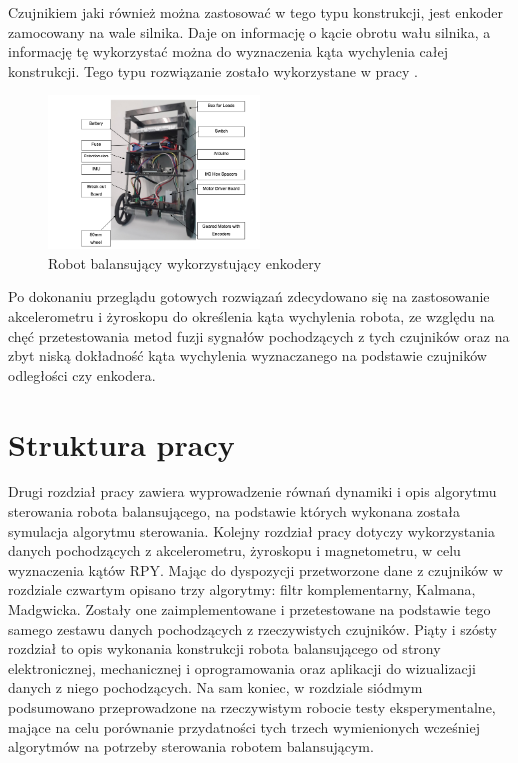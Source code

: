 Czujnikiem jaki również można zastosować w tego typu konstrukcji, jest enkoder zamocowany na wale silnika. Daje on informację o kącie obrotu wału silnika, a informację tę wykorzystać można do wyznaczenia kąta wychylenia całej konstrukcji. Tego typu rozwiązanie zostało wykorzystane w pracy \cite{Konstrukcja3}.

\begin{figure}[h!]
    \centering
	\includegraphics[width=0.5\textwidth]{Rysunki/Rozdzial01/Konstrukcja3.png}
	\caption{Robot balansujący wykorzystujący enkodery}
\end{figure}

Po dokonaniu przeglądu gotowych rozwiązań zdecydowano się na zastosowanie akcelerometru i żyroskopu do określenia kąta wychylenia robota, ze względu na chęć przetestowania metod fuzji sygnałów pochodzących z tych czujników oraz na zbyt niską dokładność kąta wychylenia wyznaczanego na podstawie czujników odległości czy enkodera. 

\section{Struktura pracy}

Drugi rozdział pracy zawiera wyprowadzenie równań dynamiki i opis algorytmu sterowania robota balansującego, na podstawie których wykonana została symulacja algorytmu sterowania. Kolejny rozdział pracy dotyczy wykorzystania danych pochodzących z akcelerometru, żyroskopu i magnetometru, w celu wyznaczenia kątów RPY. Mając do dyspozycji przetworzone dane z czujników w rozdziale czwartym opisano trzy algorytmy: filtr komplementarny, Kalmana, Madgwicka. Zostały one zaimplementowane i przetestowane na podstawie tego samego zestawu danych pochodzących z rzeczywistych czujników. Piąty i szósty rozdział to opis wykonania konstrukcji robota balansującego od strony elektronicznej, mechanicznej i oprogramowania oraz aplikacji do wizualizacji danych z niego pochodzących. Na sam koniec, w rozdziale siódmym podsumowano przeprowadzone na rzeczywistym robocie testy eksperymentalne, mające na celu porównanie przydatności tych trzech wymienionych wcześniej algorytmów na potrzeby sterowania robotem balansującym.